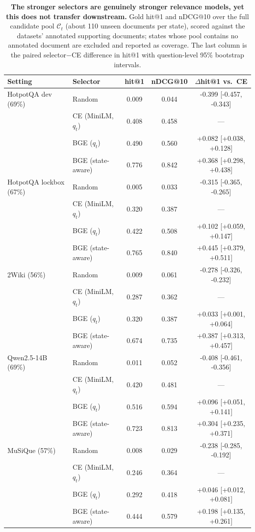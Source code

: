 \begin{table}[t]
\centering
\small
\caption{\textbf{The stronger selectors are genuinely stronger relevance
models, yet this does not transfer downstream.} Gold hit@1 and nDCG@10
over the full candidate pool $\mathcal{C}_t$ (about 110 unseen documents
per state), scored against the datasets' annotated supporting documents;
states whose pool contains no annotated document are excluded and
reported as coverage. The last column is the paired selector$-$CE
difference in hit@1 with question-level 95\% bootstrap intervals.}
\label{tab:relquality}
\begin{tabular}{llccc}
\toprule
\textbf{Setting} & \textbf{Selector} & \textbf{hit@1} & \textbf{nDCG@10} & \textbf{$\Delta$hit@1 vs.\ CE} \\
\midrule
HotpotQA dev (69\%) & Random & 0.009 & 0.044 & -0.399 [-0.457, -0.343] \\
 & CE (MiniLM, $q_t$) & 0.408 & 0.458 & --- \\
 & BGE ($q_t$) & 0.490 & 0.560 & +0.082 [+0.038, +0.128] \\
 & BGE (state-aware) & 0.776 & 0.842 & +0.368 [+0.298, +0.438] \\
\midrule
HotpotQA lockbox (67\%) & Random & 0.005 & 0.033 & -0.315 [-0.365, -0.265] \\
 & CE (MiniLM, $q_t$) & 0.320 & 0.387 & --- \\
 & BGE ($q_t$) & 0.422 & 0.508 & +0.102 [+0.059, +0.147] \\
 & BGE (state-aware) & 0.765 & 0.840 & +0.445 [+0.379, +0.511] \\
\midrule
2Wiki (56\%) & Random & 0.009 & 0.061 & -0.278 [-0.326, -0.232] \\
 & CE (MiniLM, $q_t$) & 0.287 & 0.362 & --- \\
 & BGE ($q_t$) & 0.320 & 0.387 & +0.033 [+0.001, +0.064] \\
 & BGE (state-aware) & 0.674 & 0.735 & +0.387 [+0.313, +0.457] \\
\midrule
Qwen2.5-14B (69\%) & Random & 0.011 & 0.052 & -0.408 [-0.461, -0.356] \\
 & CE (MiniLM, $q_t$) & 0.420 & 0.481 & --- \\
 & BGE ($q_t$) & 0.516 & 0.594 & +0.096 [+0.051, +0.141] \\
 & BGE (state-aware) & 0.723 & 0.813 & +0.304 [+0.235, +0.371] \\
\midrule
MuSiQue (57\%) & Random & 0.008 & 0.029 & -0.238 [-0.285, -0.192] \\
 & CE (MiniLM, $q_t$) & 0.246 & 0.364 & --- \\
 & BGE ($q_t$) & 0.292 & 0.418 & +0.046 [+0.012, +0.081] \\
 & BGE (state-aware) & 0.444 & 0.579 & +0.198 [+0.135, +0.261] \\
\bottomrule
\end{tabular}
\end{table}

